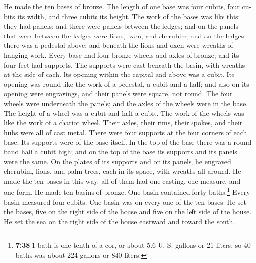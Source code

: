 \begin{paracol}{2}
\begin{otherlanguage}{english}
 He made the ten bases of bronze. The length of one base
was four cubits, four cubits its width, and three cubits its height.
 The work of the bases was like this: they had panels;
and there were panels between the ledges;  and on the
panels that were between the ledges were lions, oxen, and cherubim; and
on the ledges there was a pedestal above; and beneath the lions and oxen
were wreaths of hanging work.  Every base had four bronze
wheels and axles of bronze; and its four feet had supports. The supports
were cast beneath the basin, with wreaths at the side of each.
 Its opening within the capital and above was a cubit.
Its opening was round like the work of a pedestal, a cubit and a half;
and also on its opening were engravings, and their panels were square,
not round.  The four wheels were underneath the panels;
and the axles of the wheels were in the base. The height of a wheel was
a cubit and half a cubit.  The work of the wheels was
like the work of a chariot wheel. Their axles, their rims, their spokes,
and their hubs were all of cast metal.  There were four
supports at the four corners of each base. Its supports were of the base
itself.  In the top of the base there was a round band
half a cubit high; and on the top of the base its supports and its
panels were the same.  On the plates of its supports and
on its panels, he engraved cherubim, lions, and palm trees, each in its
space, with wreaths all around.  He made the ten bases in
this way: all of them had one casting, one measure, and one form.
 He made ten basins of bronze. One basin contained forty
baths.\footnote{\textbf{7:38} 1 bath is one tenth of a cor, or about 5.6
  U. S. gallons or 21 liters, so 40 baths was about 224 gallons or 840
  liters.} Every basin measured four cubits. One basin was on every one
of the ten bases.  He set the bases, five on the right
side of the house and five on the left side of the house. He set the sea
on the right side of the house eastward and toward the south.


\end{otherlanguage}
\end{paracol}
